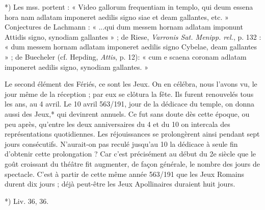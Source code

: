 \documentclass[a4paper, 11pt, oneside, polutonikogreek, french]{article}
\begin{document}
*) Les mss. portent : « Video gallorum frequentiam in templo, qui deum essena hora nam adlatam imponeret aedilis signo siae et deam gallantes, etc. » Conjectures de Lachmann : « ...qui dum messem hornam adlatam imponunt Attidis signo, synodiam gallantes » ; de Riese, \emph{Varronis Sat. Menipp. rel.}, p. 132 : « dum messem hornam adlatam imponeret aedilis signo Cybelae, deam gallantes » ; de Buecheler (cf. Hepding, \emph{Attis}, p. 12): « cum e scaena coronam adlatam imponeret aedilis signo, synodiam gallantes. »

Le second élément des Fériés, ce sont les Jeux. On en célébra, nous l'avons vu, le jour même de la réception ; par eux se clôtura la fête. Ils furent renouvelés tous les ans, au 4 avril. Le 10 avril 563/191, jour de la dédicace du temple, on donna aussi des Jeux,* qui devinrent annuels. Ce fut sans doute dès cette époque, ou peu après, qu'entre les deux anniversaires du 4 et du 10 on intercala des représentations quotidiennes. Les réjouissances se prolongèrent ainsi pendant sept jours consécutifs. N'aurait-on pas reculé jusqu'au 10 la dédicace à seule fin d'obtenir cette prolongation ? Car c'est précisément au début du 2e siècle que le goût croissant du théâtre fit augmenter, de façon générale, le nombre des jours de spectacle. C'est à partir de cette même année 563/191 que les Jeux Romains durent dix jours ; déjà peut-être les Jeux Apollinaires duraient huit jours.

*) Liv. 36, 36.
\end{document}
